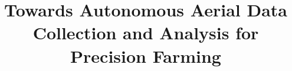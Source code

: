 \documentclass[10pt,twoside,a4paper]{article}
\begin{document}
\title{Towards Autonomous Aerial Data Collection and Analysis for Precision Farming}


\maketitle
\pagestyle{plain}


\clearpage

\pagestyle{fancy}





\clearpage
%



\end{document}
